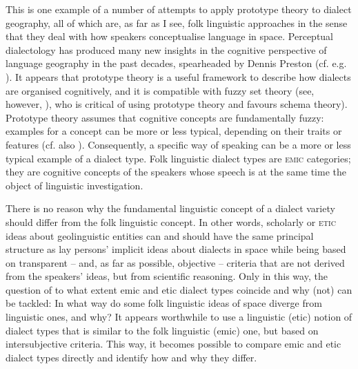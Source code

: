\documentclass[output=paper]{LSP/langsci}
\begin{document}
This is one example of a number of attempts to apply prototype theory to dialect geography, all of which are, as far as I see, folk linguistic approaches \citep{christen_dialekt_1998,anders_was_2010,klausmann_wie_2006,kristiansen_style-shifting_2008,beeching_prototype-theoretic_2009} in the sense that they deal with how speakers conceptualise language in space. Perceptual dialectology has produced many new insights in the cognitive perspective of language geography in the past decades, spearheaded by Dennis Preston (cf. e.g. \citealt{preston_perceptual_1989,preston_handbook_1999,anders_perceptual_2010}). It appears that prototype theory \citep{rosch_natural_1973,lakoff_women_1987} is a useful framework to describe how dialects are organised cognitively, and it is compatible with fuzzy set theory (see, however, \citealt[218--250]{kretzschmar_linguistics_2009}), who is critical of using prototype theory and favours schema theory). Prototype theory assumes that cognitive concepts are fundamentally fuzzy: examples for a concept can be more or less typical, depending on their traits or features (cf. also \citealt{bailey_boundaries_1973}). Consequently, a specific way of speaking can be a more or less typical example of a dialect type. Folk linguistic dialect types are \textsc{emic} categories; they are cognitive concepts of the speakers whose speech is at the same time the object of linguistic investigation.

There is no reason why the fundamental linguistic concept of a dialect variety should differ from the folk linguistic concept. In other words, scholarly or \textsc{etic} ideas about geolinguistic entities can and should have the same principal structure as lay persons’ implicit ideas about dialects in space while being based on transparent – and, as far as possible, objective – criteria that are not derived from the speakers’ ideas, but from scientific reasoning. Only in this way, the question of to what extent emic and etic dialect types coincide and why (not) can be tackled: In what way do some folk linguistic ideas of space diverge from linguistic ones, and why? It appears worthwhile to use a linguistic (etic) notion of dialect types that is similar to the folk linguistic (emic) one, but based on intersubjective criteria. This way, it becomes possible to compare emic and etic dialect types directly and identify how and why they differ. 
\end{document}
